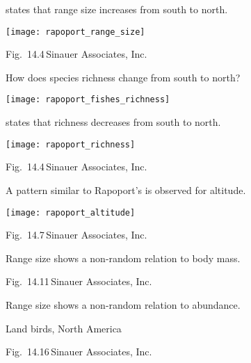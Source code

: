 \documentclass[t]{beamer}
\begin{document}
%
\begin{frame}[t]{ states that range size increases from south to north.}
	\begin{center}
		\texttt{[image: rapoport\_range\_size]}
	\end{center}

	\vfilll

	\tiny \hfill Fig.~14.4\,\textcopyright Sinauer Associates, Inc.

\end{frame}
%
\begin{frame}[t]{How does species richness change from south to north?}
	\begin{center}
		\texttt{[image: rapoport\_fishes\_richness]}
	\end{center}

\end{frame}
%
\begin{frame}[t]{ states that richness decreases from south to north.}
	\begin{center}
		\texttt{[image: rapoport\_richness]}
	\end{center}

	\vfilll

	\tiny \hfill Fig.~14.4\,\textcopyright Sinauer Associates, Inc.

\end{frame}
%
\begin{frame}[t]{A pattern similar to Rapoport's is observed for altitude.}
	\begin{center}
		\texttt{[image: rapoport\_altitude]}
	\end{center}


	\vfilll

	\tiny \hfill Fig.~14.7\,\textcopyright Sinauer Associates, Inc.

\end{frame}
%
{
\begin{frame}[t]{Range size shows a non-random relation to body mass.}

	\vfilll

	\tiny \hfill Fig.~14.11\,\textcopyright Sinauer Associates, Inc.

\end{frame}
}
%
{
\begin{frame}[t]{Range size shows a non-random relation to abundance.}

	
	\hspace{2.5cm} Land birds, North America

	\vfilll

	\tiny \hfill Fig.~14.16\,\textcopyright Sinauer Associates, Inc.
\end{frame}
}
\end{document}
